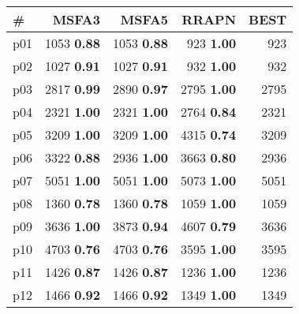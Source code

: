 \begin{tabular}{lrrrr}
\toprule
\textbf{\#} & \textbf{MSFA3} & \textbf{MSFA5} & \textbf{RRAPN} & \textbf{BEST}\\
\midrule
\multicolumn{1}{l|}{p01} & {\footnotesize 1053} \textbf{0.88} & {\footnotesize 1053} \textbf{0.88} & {\footnotesize 923} \textbf{1.00} & \multicolumn{1}{|r}{923}\\
\multicolumn{1}{l|}{p02} & {\footnotesize 1027} \textbf{0.91} & {\footnotesize 1027} \textbf{0.91} & {\footnotesize 932} \textbf{1.00} & \multicolumn{1}{|r}{932}\\
\multicolumn{1}{l|}{p03} & {\footnotesize 2817} \textbf{0.99} & {\footnotesize 2890} \textbf{0.97} & {\footnotesize 2795} \textbf{1.00} & \multicolumn{1}{|r}{2795}\\
\multicolumn{1}{l|}{p04} & {\footnotesize 2321} \textbf{1.00} & {\footnotesize 2321} \textbf{1.00} & {\footnotesize 2764} \textbf{0.84} & \multicolumn{1}{|r}{2321}\\
\multicolumn{1}{l|}{p05} & {\footnotesize 3209} \textbf{1.00} & {\footnotesize 3209} \textbf{1.00} & {\footnotesize 4315} \textbf{0.74} & \multicolumn{1}{|r}{3209}\\
\multicolumn{1}{l|}{p06} & {\footnotesize 3322} \textbf{0.88} & {\footnotesize 2936} \textbf{1.00} & {\footnotesize 3663} \textbf{0.80} & \multicolumn{1}{|r}{2936}\\
\multicolumn{1}{l|}{p07} & {\footnotesize 5051} \textbf{1.00} & {\footnotesize 5051} \textbf{1.00} & {\footnotesize 5073} \textbf{1.00} & \multicolumn{1}{|r}{5051}\\
\multicolumn{1}{l|}{p08} & {\footnotesize 1360} \textbf{0.78} & {\footnotesize 1360} \textbf{0.78} & {\footnotesize 1059} \textbf{1.00} & \multicolumn{1}{|r}{1059}\\
\multicolumn{1}{l|}{p09} & {\footnotesize 3636} \textbf{1.00} & {\footnotesize 3873} \textbf{0.94} & {\footnotesize 4607} \textbf{0.79} & \multicolumn{1}{|r}{3636}\\
\multicolumn{1}{l|}{p10} & {\footnotesize 4703} \textbf{0.76} & {\footnotesize 4703} \textbf{0.76} & {\footnotesize 3595} \textbf{1.00} & \multicolumn{1}{|r}{3595}\\
\multicolumn{1}{l|}{p11} & {\footnotesize 1426} \textbf{0.87} & {\footnotesize 1426} \textbf{0.87} & {\footnotesize 1236} \textbf{1.00} & \multicolumn{1}{|r}{1236}\\
\multicolumn{1}{l|}{p12} & {\footnotesize 1466} \textbf{0.92} & {\footnotesize 1466} \textbf{0.92} & {\footnotesize 1349} \textbf{1.00} & \multicolumn{1}{|r}{1349}\\

\end{tabular}
